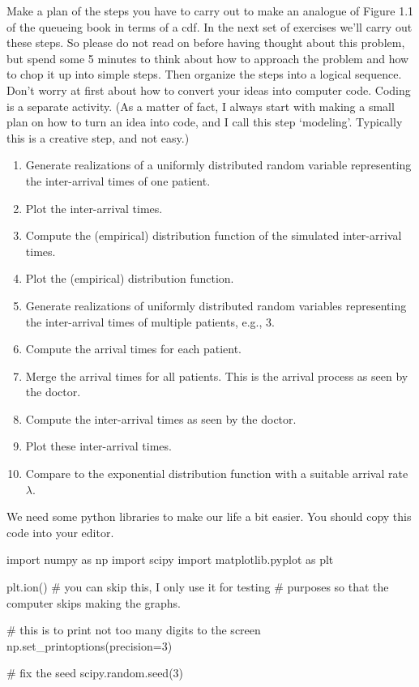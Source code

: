 \begin{exercise}
  Make a plan of the steps you have to carry out to make an analogue of Figure 1.1 of the queueing book in terms of a cdf.
  In the next set of exercises we'll carry out these steps.
  So please do not read on before having thought about this problem, but spend some 5 minutes to think about how to approach the problem and how to chop it up into simple steps.
  Then organize the steps into a logical sequence.
  Don't worry at first about how to convert your ideas into computer code.
  Coding is a separate activity.
  (As a matter of fact, I always start with making a small plan on how to turn an idea into code, and I call this step `modeling'.
  Typically this is a creative step, and not easy.)

\begin{solution}
    \begin{enumerate}
    \item Generate realizations of a uniformly distributed random variable representing the inter-arrival times of one patient.
    \item Plot the inter-arrival times.
    \item Compute the (empirical) distribution function of the simulated inter-arrival times.
    \item Plot the (empirical) distribution function.
    \item Generate realizations of uniformly distributed random variables representing the inter-arrival times of multiple patients, e.g., 3.
    \item Compute the arrival times for each patient.
    \item Merge  the arrival times for all patients. This is the arrival process as seen by the doctor.
    \item Compute the inter-arrival times as seen by the doctor.
    \item Plot these inter-arrival times.
    \item Compare to the exponential distribution function with a suitable arrival rate $\lambda$.
    \end{enumerate}
\end{solution}
\end{exercise}

We need some python libraries to make our life a bit easier. You should copy this code into your editor.

\begin{pyverbatim}
import numpy as np
import scipy
import matplotlib.pyplot as plt

plt.ion()  # you can skip this, I only use it for testing
           # purposes so that the computer skips making the graphs.

# this is to print not too many digits to the screen
np.set_printoptions(precision=3)

# fix the seed
scipy.random.seed(3)
\end{pyverbatim}

